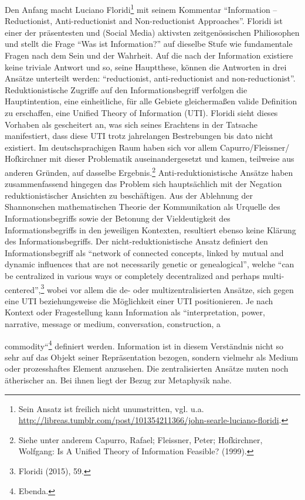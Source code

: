 \documentclass[a4paper,
fontsize=11pt,
oneside,
numbers=noperiodatend,
parskip=half-,
bibliography=totoc,
final
]{scrartcl}
\begin{document}
Den Anfang macht Luciano Floridi\footnote{Sein Ansatz ist freilich nicht
  unumstritten, vgl. u.a.
  \url{http://libreas.tumblr.com/post/101354211366/john-searle-luciano-floridi}.}
mit seinem Kommentar \enquote{Information -- Reductionist,
Anti-reductionist and Non-reductionist Approaches}. Floridi ist einer
der präsentesten und (Social Media) aktivsten zeitgenössischen
Philiosophen und stellt die Frage \enquote{Was ist Information?} auf
dieselbe Stufe wie fundamentale Fragen nach dem Sein und der Wahrheit.
Auf die nach der Information existiere keine triviale Antwort und so,
seine Hauptthese, können die Antworten in drei Ansätze unterteilt
werden: \enquote{reductionist, anti-reductionist and non-reductionist}.
Reduktionistische Zugriffe auf den Informationsbegriff verfolgen die
Hauptintention, eine einheitliche, für alle Gebiete gleichermaßen valide
Definition zu erschaffen, eine Unified Theory of Information (UTI).
Floridi sieht dieses Vorhaben als gescheitert an, was sich seines
Erachtens in der Tatsache manifestiert, dass diese UTI trotz jahrelangen
Bestrebungen bis dato nicht existiert. Im deutschsprachigen Raum haben
sich vor allem Capurro/Fleissner/ Hofkirchner mit dieser Problematik
auseinandergesetzt und kamen, teilweise aus anderen Gründen, auf
dasselbe Ergebnis.\footnote{Siehe unter anderem Capurro, Rafael;
  Fleissner, Peter; Hofkirchner, Wolfgang: Is A Unified Theory of
  Information Feasible? (1999).} Anti-reduktionistische Ansätze haben
zusammenfassend hingegen das Problem sich hauptsächlich mit der Negation
reduktionistischer Ansichten zu beschäftigen. Aus der Ablehnung der
Shannonschen mathematischen Theorie der Kommunikation als Urquelle des
Informationsbegriffs sowie der Betonung der Vieldeutigkeit des
Informationsbegriffs in den jeweiligen Kontexten, resultiert ebenso
keine Klärung des Informationsbegriffs. Der nicht-reduktionistische
Ansatz definiert den Informationsbegriff als \enquote{network of
connected concepts, linked by mutual and dynamic influences that are not
necessarily genetic or genealogical}, welche \enquote{can be centralized
in various ways or completely decentralized and perhaps
multi-centered},\footnote{Floridi (2015), 59.} wobei vor allem die de-
oder multizentralisierten Ansätze, sich gegen eine UTI beziehungsweise
die Möglichkeit einer UTI positionieren. Je nach Kontext oder
Fragestellung kann Information als ``interpretation, power, narrative,
message or medium, conversation, construction, a

commodity``\footnote{Ebenda.} definiert werden. Information ist in
diesem Verständnis nicht so sehr auf das Objekt seiner Repräsentation
bezogen, sondern vielmehr als Medium oder prozesshaftes Element
anzusehen. Die zentralisierten Ansätze muten noch ätherischer an. Bei
ihnen liegt der Bezug zur Metaphysik nahe.
\end{document}
